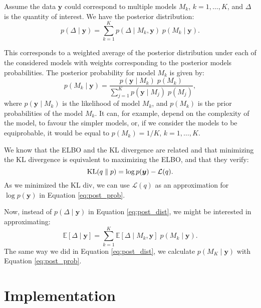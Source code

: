 \documentclass{article}
\numberwithin{equation}{section}
\DeclareMathOperator*{\KL}{{\rm KL}}
\begin{document}
Assume the data $\boldsymbol{y}$ could correspond to multiple models $M_k$, $k= 1,\ldots,K$, and $\Delta$ is the quantity of interest. We have the posterior distribution:
\begin{equation}
p(\Delta \mid \boldsymbol{y}) = \sum_{k=1}^K p(\Delta \mid M_k,\boldsymbol{y}) \; p(M_k \mid \boldsymbol{y}).
\label{eq:post_dist}
\end{equation}

This corresponds to a weighted average of the posterior distribution under each of the considered models with weights corresponding to the posterior models probabilities. The posterior probability for model $M_k$ is given by:
\begin{equation}
p(M_k \mid \boldsymbol{y}) = \frac{p(\boldsymbol{y} \mid M_k)\; p(M_k)}{\sum_{j=1}^K p(\boldsymbol{y} \mid M_j)\; p(M_j)},
\label{eq:post_prob}
\end{equation}
where $p(\boldsymbol{y} \mid M_k)$ is the likelihood of model $M_k$, and $p(M_k)$ is the prior probabilities of the model $M_k$. It can, for example, depend on the complexity of the model, to favour the simpler models, or, if we consider the models to be equiprobable, it would be equal to $p(M_k) = 1/K$, $k = 1,\ldots,K$.  

We know that the \small{ELBO} and the KL divergence are related and that minimizing the KL divergence is equivalent to maximizing the \small{ELBO}, and that they verify: 
\begin{equation*}
\KL(q\parallel p) = \log p (\boldsymbol{y}) - \mathcal{L}(q).
\end{equation*}
As we minimized the KL div, we can use $\mathcal{L}(q)$ as an approximation for $\log p(\boldsymbol{y})$ in Equation \ref{eq:post_prob}.

Now, instead of $p(\Delta \mid \boldsymbol{y})$ in Equation \ref{eq:post_dist}, we might be interested in approximating:
\begin{equation*}
\mathbb{E}\left[\Delta \mid \boldsymbol{y}\right] = \sum_{k=1}^K\mathbb{E}\left[\Delta \mid M_k, \boldsymbol{y}\right]\;p(M_k \mid \boldsymbol{y}).
\end{equation*}
The same way we did in Equation \ref{eq:post_dist}, we calculate $p(M_K \mid \boldsymbol{y})$ with Equation \ref{eq:post_prob}.


\newpage
\section{Implementation}
\end{document}
